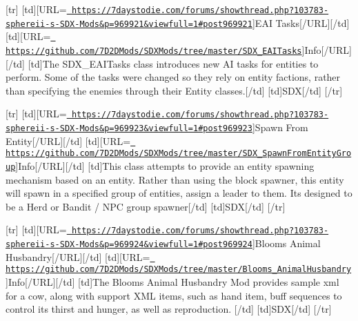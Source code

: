 \mbox{[}tr\mbox{]} \mbox{[}td\mbox{]}\mbox{[}U\+RL=\href{https://7daystodie.com/forums/showthread.php?103783-sphereii-s-SDX-Mods&p=969921&viewfull=1\#post969921}{\texttt{ https\+://7daystodie.\+com/forums/showthread.\+php?103783-\/sphereii-\/s-\/\+S\+D\+X-\/\+Mods\&p=969921\&viewfull=1\#post969921}}\mbox{]}E\+AI Tasks\mbox{[}/\+U\+RL\mbox{]}\mbox{[}/td\mbox{]} \mbox{[}td\mbox{]}\mbox{[}U\+RL=\href{https://github.com/7D2DMods/SDXMods/tree/master/SDX_EAITasks}{\texttt{ https\+://github.\+com/7\+D2\+D\+Mods/\+S\+D\+X\+Mods/tree/master/\+S\+D\+X\+\_\+\+E\+A\+I\+Tasks}}\mbox{]}Info\mbox{[}/\+U\+RL\mbox{]}\mbox{[}/td\mbox{]} \mbox{[}td\mbox{]}The S\+D\+X\+\_\+\+E\+A\+I\+Tasks class introduces new AI tasks for entities to perform. Some of the tasks were changed so they rely on entity factions, rather than specifying the enemies through their Entity classes.\mbox{[}/td\mbox{]} \mbox{[}td\mbox{]}S\+DX\mbox{[}/td\mbox{]} \mbox{[}/tr\mbox{]}

\mbox{[}tr\mbox{]} \mbox{[}td\mbox{]}\mbox{[}U\+RL=\href{https://7daystodie.com/forums/showthread.php?103783-sphereii-s-SDX-Mods&p=969923&viewfull=1\#post969923}{\texttt{ https\+://7daystodie.\+com/forums/showthread.\+php?103783-\/sphereii-\/s-\/\+S\+D\+X-\/\+Mods\&p=969923\&viewfull=1\#post969923}}\mbox{]}Spawn From Entity\mbox{[}/\+U\+RL\mbox{]}\mbox{[}/td\mbox{]} \mbox{[}td\mbox{]}\mbox{[}U\+RL=\href{https://github.com/7D2DMods/SDXMods/tree/master/SDX_SpawnFromEntityGroup}{\texttt{ https\+://github.\+com/7\+D2\+D\+Mods/\+S\+D\+X\+Mods/tree/master/\+S\+D\+X\+\_\+\+Spawn\+From\+Entity\+Group}}\mbox{]}Info\mbox{[}/\+U\+RL\mbox{]}\mbox{[}/td\mbox{]} \mbox{[}td\mbox{]}This class attempts to provide an entity spawning mechanism based on an entity. Rather than using the block spawner, this entity will spawn in a specified group of entities, assign a leader to them. It\textquotesingle{}s designed to be a Herd or Bandit / N\+PC group spawner\mbox{[}/td\mbox{]} \mbox{[}td\mbox{]}S\+DX\mbox{[}/td\mbox{]} \mbox{[}/tr\mbox{]}

\mbox{[}tr\mbox{]} \mbox{[}td\mbox{]}\mbox{[}U\+RL=\href{https://7daystodie.com/forums/showthread.php?103783-sphereii-s-SDX-Mods&p=969924&viewfull=1\#post969924}{\texttt{ https\+://7daystodie.\+com/forums/showthread.\+php?103783-\/sphereii-\/s-\/\+S\+D\+X-\/\+Mods\&p=969924\&viewfull=1\#post969924}}\mbox{]}Bloom\textquotesingle{}s Animal Husbandry\mbox{[}/\+U\+RL\mbox{]}\mbox{[}/td\mbox{]} \mbox{[}td\mbox{]}\mbox{[}U\+RL=\href{https://github.com/7D2DMods/SDXMods/tree/master/Blooms_AnimalHusbandry}{\texttt{ https\+://github.\+com/7\+D2\+D\+Mods/\+S\+D\+X\+Mods/tree/master/\+Blooms\+\_\+\+Animal\+Husbandry}}\mbox{]}Info\mbox{[}/\+U\+RL\mbox{]}\mbox{[}/td\mbox{]} \mbox{[}td\mbox{]}The Bloom\textquotesingle{}s Animal Husbandry Mod provides sample xml for a cow, along with support X\+ML items, such as hand item, buff sequences to control its thirst and hunger, as well as reproduction. \mbox{[}/td\mbox{]} \mbox{[}td\mbox{]}S\+DX\mbox{[}/td\mbox{]} \mbox{[}/tr\mbox{]}


